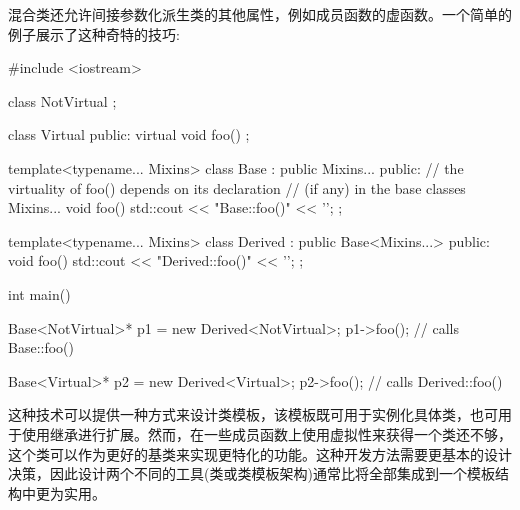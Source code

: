 混合类还允许间接参数化派生类的其他属性，例如成员函数的虚函数。一个简单的例子展示了这种奇特的技巧:

\begin{cpp}
#include <iostream>

class NotVirtual {
};

class Virtual {
	public:
	virtual void foo() {
	}
};

template<typename... Mixins>
class Base : public Mixins... {
	public:
	// the virtuality of foo() depends on its declaration
	// (if any) in the base classes Mixins...
	void foo() {
		std::cout << "Base::foo()" << ’\n’;
	}
};

template<typename... Mixins>
class Derived : public Base<Mixins...> {
	public:
	void foo() {
		std::cout << "Derived::foo()" << ’\n’;
	}
};

int main()
{
	Base<NotVirtual>* p1 = new Derived<NotVirtual>;
	p1->foo(); // calls Base::foo()
	
	Base<Virtual>* p2 = new Derived<Virtual>;
	p2->foo(); // calls Derived::foo()
}
\end{cpp}

这种技术可以提供一种方式来设计类模板，该模板既可用于实例化具体类，也可用于使用继承进行扩展。然而，在一些成员函数上使用虚拟性来获得一个类还不够，这个类可以作为更好的基类来实现更特化的功能。这种开发方法需要更基本的设计决策，因此设计两个不同的工具(类或类模板架构)通常比将全部集成到一个模板结构中更为实用。






